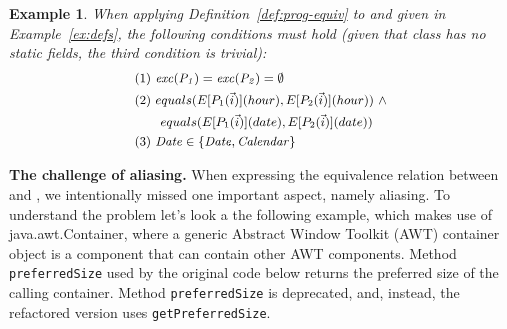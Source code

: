 \documentclass[sigconf]{acmart}
\newtheorem{example}{Example}
\begin{document}
\begin{example}\label{ex:equiv}
  When applying Definition~\ref{def:prog-equiv} to  and  given in Example~\ref{ex:defs},
  the following conditions must hold (given that class  has no static fields, the third condition is trivial):
  \[
\small
\begin{aligned}
      & (1)~ \var{exc(P_1)}=\var{exc(P_2)} =\emptyset\\
      & (2)~ equals(E[P_1(\vec{i})](hour), E[P_2(\vec{i})](hour)) ~ \wedge\\ %
      & \qquad equals(E[P_1(\vec{i})](date), E[P_2(\vec{i})](date))\\
& (3)~  \var{Date} \in \{\var{Date}, \var{Calendar}\}
    \end{aligned}
    \]



\end{example}


{\bf The challenge of aliasing.}
%
When expressing the equivalence relation between  and , we
intentionally missed one important aspect, namely aliasing.  To understand
the problem let's look a the following example, which makes use of
java.awt.Container, where a generic Abstract Window Toolkit (AWT) container
object is a component that can contain other AWT components.  Method
\lstinline[breaklines=true]{preferredSize} used by the original code below returns the preferred
size of the calling container. Method
\lstinline[breaklines=true]{preferredSize} is deprecated, and, instead, the refactored version
uses \lstinline[breaklines=true]{getPreferredSize}.

\end{document}
